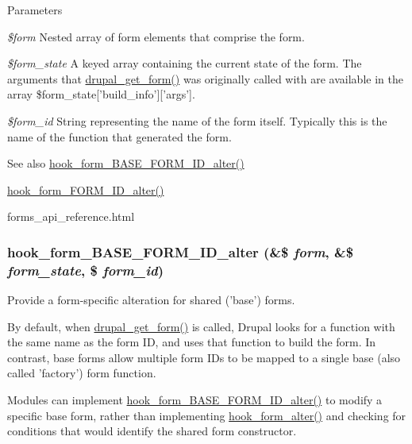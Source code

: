 \begin{DoxyParams}{Parameters}
\item[{\em \$form}]Nested array of form elements that comprise the form. \item[{\em \$form\_\-state}]A keyed array containing the current state of the form. The arguments that \hyperlink{group__form__api_ga720df81a837b06dfe19daf1c1eea3437}{drupal\_\-get\_\-form()} was originally called with are available in the array \$form\_\-state\mbox{[}'build\_\-info'\mbox{]}\mbox{[}'args'\mbox{]}. \item[{\em \$form\_\-id}]String representing the name of the form itself. Typically this is the name of the function that generated the form.\end{DoxyParams}
\begin{DoxySeeAlso}{See also}
\hyperlink{group__hooks_gaf0cfc224a88c8823da68856c30a4841a}{hook\_\-form\_\-BASE\_\-FORM\_\-ID\_\-alter()} 

\hyperlink{group__hooks_ga8d4a4089551493d55911bd5c4f218264}{hook\_\-form\_\-FORM\_\-ID\_\-alter()} 

forms\_\-api\_\-reference.html 
\end{DoxySeeAlso}
\hypertarget{group__hooks_gaf0cfc224a88c8823da68856c30a4841a}{
\subsubsection[{hook\_\-form\_\-BASE\_\-FORM\_\-ID\_\-alter}]{\setlength{\rightskip}{0pt plus 5cm}hook\_\-form\_\-BASE\_\-FORM\_\-ID\_\-alter (\&\$ {\em form}, \/  \&\$ {\em form\_\-state}, \/  \$ {\em form\_\-id})}}
\label{group__hooks_gaf0cfc224a88c8823da68856c30a4841a}
Provide a form-\/specific alteration for shared ('base') forms.

By default, when \hyperlink{group__form__api_ga720df81a837b06dfe19daf1c1eea3437}{drupal\_\-get\_\-form()} is called, Drupal looks for a function with the same name as the form ID, and uses that function to build the form. In contrast, base forms allow multiple form IDs to be mapped to a single base (also called 'factory') form function.

Modules can implement \hyperlink{group__hooks_gaf0cfc224a88c8823da68856c30a4841a}{hook\_\-form\_\-BASE\_\-FORM\_\-ID\_\-alter()} to modify a specific base form, rather than implementing \hyperlink{group__hooks_ga6df3cea27ae1407aeef4eae5444cb213}{hook\_\-form\_\-alter()} and checking for conditions that would identify the shared form constructor.

